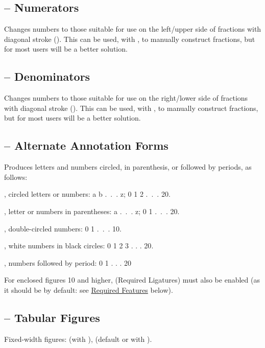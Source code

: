 \subsection{ – Numerators}
Changes numbers to those suitable for use on the left/upper side of fractions
with diagonal stroke (). This can be used, with , to manually construct
fractions, but for most users  will be a better solution.

\subsection{ – Denominators}
Changes numbers to those suitable for use on the right/lower side of fractions
with diagonal stroke (). This can be used, with , to manually construct
fractions, but for most users  will be a better solution.

\subsection{ – Alternate Annotation Forms}
Produces letters and numbers circled, in parenthesis, or followed by periods, as follows:

, circled letters or numbers: {a b .~.~. z; 0 1 2 .~.~. 20}.

, letter or numbers in parentheses: {a .~.~. z; 0 1 .~.~. 20}.

, double-circled numbers: {0 1 .~.~. 10}.

, white numbers in black circles: {0 1 2 3 . . . 20}.

, numbers followed by period: {0 1 . . . 20}

\noindent For enclosed figures 10 and higher, 
(Required Ligatures) must also be enabled (as it should
be by default: see \hyperlink{req}{Required Features} below).

\subsection{ – Tabular Figures}
Fixed-width figures:  (with ),  (default or with
).

